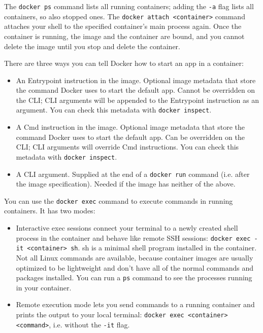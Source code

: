 \documentclass[table, xcdraw]{article}%
\begin{document}
The \texttt{docker ps} command lists all running containers; adding the \texttt{-a} flag lists all containers, so also stopped ones. The \texttt{docker attach <container>} command attaches your shell to the specified container’s main process again. Once the container is running, the image and the container are bound, and you cannot delete the image until you stop and delete the container.

There are three ways you can tell Docker how to start an app in a container:

\begin{itemize}
    \item An Entrypoint instruction in the image. Optional image metadata that store the command Docker uses to start the default app. Cannot be overridden on the CLI; CLI arguments will be appended to the Entrypoint instruction as an argument. You can check this metadata with \texttt{docker inspect}.
    \item A Cmd instruction in the image. Optional image metadata that store the command Docker uses to start the default app. Can be overridden on the CLI; CLI arguments will override Cmd instructions. You can check this metadata with \texttt{docker inspect}.
    \item A CLI argument. Supplied at the end of a \texttt{docker run} command (i.e. after the image specification). Needed if the image has neither of the above.
\end{itemize}

You can use the \texttt{docker exec} command to execute commands in running containers. It has two modes:

\begin{itemize}
    \item Interactive exec sessions connect your terminal to a newly created shell process in the container and behave like remote SSH sessions: \texttt{docker exec -it <container> sh}. sh is a minimal shell program installed in the container. Not all Linux commands are available, because container images are usually optimized to be lightweight and don’t have all of the normal commands and packages installed. You can run a \texttt{ps} command to see the processes running in your container. 
    \item Remote execution mode lets you send commands to a running container and prints the output to your local terminal: \texttt{docker exec <container> <command>}, i.e. without the \texttt{-it} flag.
\end{itemize}
\end{document}
